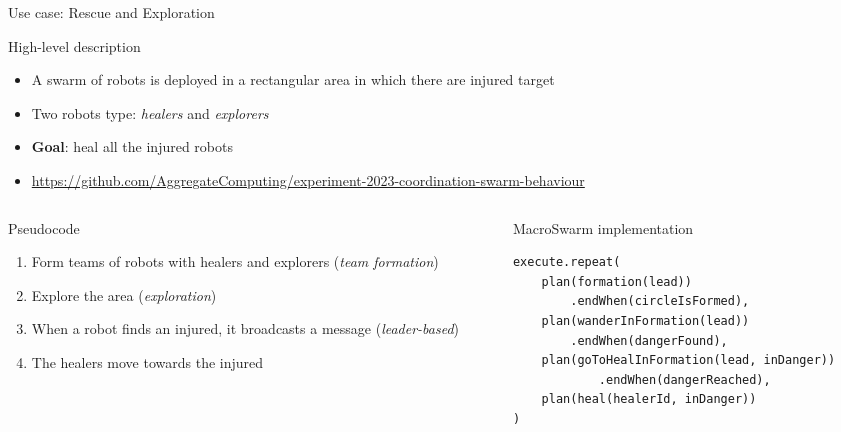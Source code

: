 \documentclass[presentation, 9pt]{beamer}\mode<presentation>{\usetheme{AMSBolognaFC}}
\begin{document}
\begin{frame}[fragile]{Use case: Rescue and Exploration}
\begin{exampleblock}{High-level description}
	\begin{itemize}
		\item A swarm of robots is deployed in a rectangular area in which there are injured target
		\item Two robots type: \emph{healers} and \emph{explorers}
		\item \textbf{Goal}: heal all the injured robots
		\item \url{https://github.com/AggregateComputing/experiment-2023-coordination-swarm-behaviour}
	\end{itemize}
\end{exampleblock}
\begin{columns}
\begin{column}{0.4\textwidth}

\begin{alertblock}{Pseudocode}
	\begin{enumerate}
		\item Form teams of robots with healers and explorers (\emph{team formation})
		\item Explore the area (\emph{exploration})
		\item When a robot finds an injured, it broadcasts a message (\emph{leader-based})
		\item The healers move towards the injured
	\end{enumerate}
\end{alertblock}
\end{column}

\begin{column}{0.55\textwidth}
	\begin{block}{MacroSwarm implementation}
		\begin{verbatim}
execute.repeat(
	plan(formation(lead))
		.endWhen(circleIsFormed),
	plan(wanderInFormation(lead))
		.endWhen(dangerFound),
	plan(goToHealInFormation(lead, inDanger))
			.endWhen(dangerReached),
	plan(heal(healerId, inDanger))
)
		\end{verbatim}
	\end{block}
\end{column}

\end{columns}
\end{frame}
\end{document}
